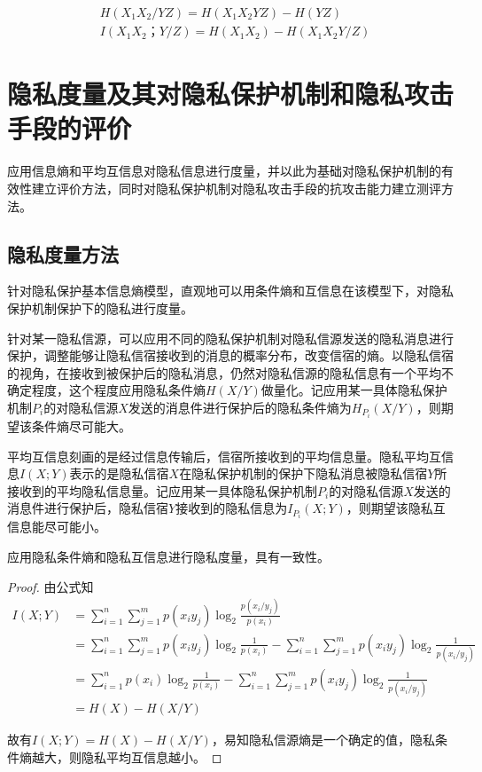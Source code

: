 \begin{equation}
\begin{split}
&H(X_{1}X_{2}/YZ)=H(X_{1}X_{2}YZ)-H(YZ)\\
&I(X_{1}X_{2}；Y/Z)=H(X_{1}X_{2})-H(X_{1}X_{2}Y/Z)
\end{split}
\end{equation}

\section{隐私度量及其对隐私保护机制和隐私攻击手段的评价}\label{Privacy measures}
应用信息熵和平均互信息对隐私信息进行度量，并以此为基础对隐私保护机制的有效性建立评价方法，同时对隐私保护机制对隐私攻击手段的抗攻击能力建立测评方法。

\subsection{隐私度量方法}
针对隐私保护基本信息熵模型，直观地可以用条件熵和互信息在该模型下，对隐私保护机制保护下的隐私进行度量。

针对某一隐私信源，可以应用不同的隐私保护机制对隐私信源发送的隐私消息进行保护，调整能够让隐私信宿接收到的消息的概率分布，改变信宿的熵。以隐私信宿的视角，在接收到被保护后的隐私消息，仍然对隐私信源的隐私信息有一个平均不确定程度，这个程度应用隐私条件熵$H(X/Y)$做量化。记应用某一具体隐私保护机制$P_{i}$的对隐私信源$X$发送的消息件进行保护后的隐私条件熵为$H_{P_{i}}(X/Y)$，则期望该条件熵尽可能大。

平均互信息刻画的是经过信息传输后，信宿所接收到的平均信息量。隐私平均互信息$I(X;Y)$表示的是隐私信宿$X$在隐私保护机制的保护下隐私消息被隐私信宿$Y$所接收到的平均隐私信息量。记应用某一具体隐私保护机制$P_{i}$的对隐私信源$X$发送的消息件进行保护后，隐私信宿$Y$接收到的隐私信息为$I_{P_{i}}(X;Y)$，则期望该隐私互信息能尽可能小。

\begin{property}
应用隐私条件熵和隐私互信息进行隐私度量，具有一致性。
\end{property}
\begin{proof}
	由公式知
	\begin{equation}
	\begin{split}
	I(X;Y)&=\sum_{i=1}^{n}\sum_{j=1}^{m}p(x_{i}y_{j})\log_{2}\frac{p(x_{i}/y_{j})}{p(x_{i})}\\
	&=\sum_{i=1}^{n}\sum_{j=1}^{m}p(x_{i}y_{j})\log_{2}\frac{1}{p(x_{i})}-\sum_{i=1}^{n}\sum_{j=1}^{m}p(x_{i}y_{j})\log_{2}\frac{1}{p(x_{i}/y_{j})}\\
	&=\sum_{i=1}^{n}p(x_{i})\log_{2}\frac{1}{p(x_{i})}-\sum_{i=1}^{n}\sum_{j=1}^{m}p(x_{i}y_{j})\log_{2}\frac{1}{p(x_{i}/y_{j})}\\
	&=H(X)-H(X/Y)
	\end{split}
	\end{equation}
	
	故有$I(X;Y)=H(X)-H(X/Y)$，易知隐私信源熵是一个确定的值，隐私条件熵越大，则隐私平均互信息越小。
\end{proof}


